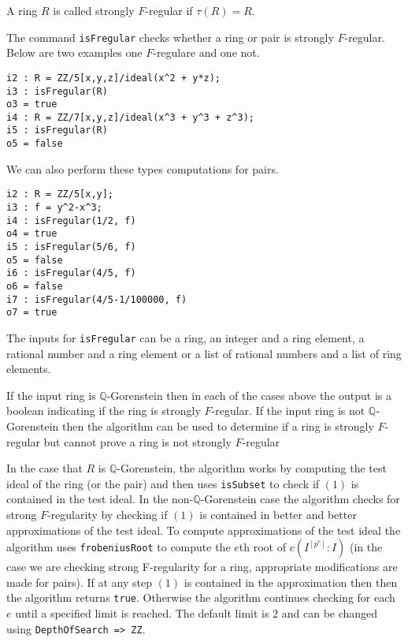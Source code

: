 \documentclass[11pt]{amsart}
\begin{document}
\begin{definition}
A ring $R$ is called strongly $F$-regular if $\tau(R) = R$.
\end{definition}

The command {\tt isFregular} checks whether a ring or pair is strongly $F$-regular. Below are two examples one $F$-regulare and one not.

\begin{verbatim}
i2 : R = ZZ/5[x,y,z]/ideal(x^2 + y*z);
i3 : isFregular(R)
o3 = true
i4 : R = ZZ/7[x,y,z]/ideal(x^3 + y^3 + z^3);
i5 : isFregular(R)
o5 = false
\end{verbatim}

We can also perform these types computations for pairs.

\begin{verbatim}
i2 : R = ZZ/5[x,y];
i3 : f = y^2-x^3;
i4 : isFregular(1/2, f)
o4 = true
i5 : isFregular(5/6, f)
o5 = false
i6 : isFregular(4/5, f)
o6 = false
i7 : isFregular(4/5-1/100000, f)
o7 = true
\end{verbatim}

The inputs for {\tt isFregular} can be a ring, an integer and a ring element, a rational number and a ring element or a list of rational numbers and a list of ring elements.

If the input ring is $\mathbb{Q}$-Gorenstein then in each of the cases above the output is a boolean indicating if the ring is strongly $F$-regular. If the input ring is not $\mathbb{Q}$-Gorenstein then the algorithm can be used to determine if a ring is strongly $F$-regular but cannot prove a ring is not strongly $F$-regular

In the case that $R$ is $\mathbb{Q}$-Gorenstein, the algorithm works by computing the test ideal of the ring (or the pair) and then uses {\tt isSubset} to check if $(1)$  is contained in the test ideal. In the non-$\mathbb{Q}$-Gorenstein case the algorithm checks for strong $F$-regularity by checking if $(1)$ is contained in better and better approximations of the test ideal. To compute approximations of the test ideal the algorithm uses {\tt frobeniusRoot} to compute the $e$th root of $c(I^{[p^{e}]} : I)$ (in the case we are checking strong F-regularity for a ring, appropriate modifications are made for pairs). If at any step $(1)$ is contained in the approximation then then the algorithm returns {\tt true}. Otherwise the algorithm continues checking for each $e$ until a specified limit is reached. The default limit is 2 and can be changed using {\tt DepthOfSearch => ZZ}.
\end{document}
